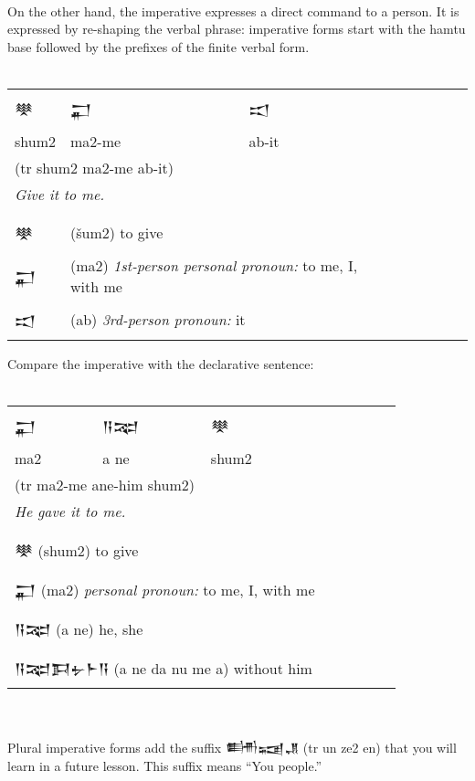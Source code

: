 \documentclass[a4paper,12pt]{book}
\newcommand{\fcn}{\setmainfont{Akkadian.otf}}
\newcommand{\fcm}{\large\setmainfont{Akkadian.otf}}
\newcommand{\fsm}{\Large\setmainfont{Akkadian.otf}}
\begin{document}
\verb||\\
On the other hand, the imperative expresses
a direct command to a person. It is expressed
by re-shaping the verbal phrase: imperative
forms start with the hamtu base followed by
the prefixes of the finite verbal form.\\

\verb||\\
\begin{tabular}[!h]{l l l l l l l l l l}
  \fsm  𒋧 &\fsm 𒂷&\fsm 𒀊\\
  shum2    & ma2-me & ab-it\\
  \multicolumn{3}{l}{(tr shum2 ma2-me ab-it)}\\
  \multicolumn{3}{l}{\em Give it to me.}\\
  \hline\\
  \fsm 𒋧  &\multicolumn{2}{l}{(šum2) to give}\\
  \fsm 𒂷
  &\multicolumn{2}{l}{(ma2)
    {\em 1st-person personal pronoun:}
    to me, I, with me}\\
  \fsm 𒀊  &\multicolumn{2}{l}{(ab) {\em 3rd-person pronoun:} it}\\
\end{tabular}
\index{ma2-me {\fcn 𒂷}  ! to me, I, with me}

\newpage
\noindent
Compare the imperative with the declarative sentence:\\

\verb||\\
\begin{tabular}[!h]{l l l l l l l l}
  \fsm 𒂷 &\fsm 𒀀𒉈 &\fsm 𒋧\\
  ma2 & a ne & shum2\\
  \multicolumn{3}{l}{(tr ma2-me ane-him shum2)}\\
  \multicolumn{3}{l}{\em He gave it to me.}\\
  \hline\\
  \multicolumn{3}{l}{{\fcm 𒋧} (shum2) to give }\\
  \multicolumn{3}{l}{{\fcm 𒂷} (ma2)
    {\em personal pronoun:} to me, I, with me }\\
  \multicolumn{3}{l}{{\fcm 𒀀𒉈} (a ne) he, she }\\
  \multicolumn{3}{l}{{\fcm 𒀀𒉈𒁕𒉡𒈨𒀀} (a ne da nu me a) without him }\\
\end{tabular}\verb||\\

\verb||\\
Plural imperative forms add the
suffix {\fcn 𒌦𒍢𒂗} (tr un ze2 en) that
you will learn in a future lesson. This suffix
means ``You people.''\\
\end{document}
